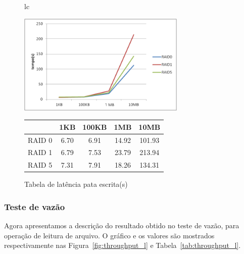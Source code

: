 	\begin{figure}[h]
		\begin{tabular}{lc}
			\begin{minipage}{.50\textwidth}
				\begin{center}
					
					\includegraphics[clip,width=8.0cm]{images/resultados/latencia_escrita.png}
					\caption{Gráfico de latência pata escrita}
					\label{fig:latencia_e}
					
				\end{center}
				
			\end{minipage}
			
			\begin{minipage}{.5\textwidth}
				\makeatletter
				\def\@captype{table}
				\makeatother
				\caption{Tabela de latência pata escrita(s)}
				\label{tab:latencia_e}
				\begin{center}
					\begin{tabular}{|c|c|c|c|c|} \hline
								& 1KB  & 100KB & 1MB   & 10MB \\ \hline
						RAID 0	& 6.70 & 6.91 & 14.92 & 101.93\\ \hline
						RAID 1	& 6.79 & 7.53 & 23.79 & 213.94\\ \hline
						RAID 5	& 7.31 & 7.91 & 18.26 & 134.31\\ \hline
						
					\end{tabular}
					
				\end{center}
			\end{minipage}
		\end{tabular}
	\end{figure}
	
	\subsubsection{Teste de vazão}
	Agora apresentamos a descrição do resultado obtido no teste de vazão, para operação de leitura de arquivo. O gráfico e os valores são mostrados respectivamente nas Figura~\ref{fig:throughput_l} e Tabela~\ref{tab:throughput_l}.
	\\
	
